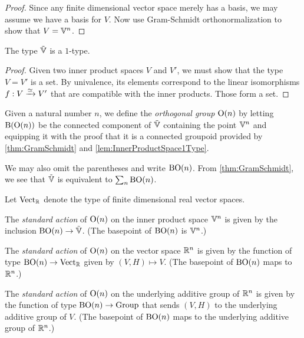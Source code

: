 \begin{proof}
  Since any finite dimensional vector space merely has a basis, we may assume
  we have a basis for $V$.  Now use Gram-Schmidt orthonormalization to show
  that $V = \mathbb V^n$.
\end{proof}

\begin{lemma}\label{lem:InnerProductSpace1Type}
  The type ${\tilde {\mathbb V}}$ is a $1$-type.
\end{lemma}

\begin{proof}
  Given two inner product spaces $V$ and $V'$, we must show that the type
  $V=V'$ is a set.  By univalence, its elements correspond to the linear
  isomorphisms $f : V \xrightarrow {\simeq} V'$ that are compatible with the
  inner products.  Those form a set.
\end{proof}

\begin{definition}\label{def:OrthogonalGroup}
  Given a natural number $n$, we define the {\em orthogonal group} $\mathrm{O}(n)$
  by letting $\mathrm{B} (\mathrm{O}(n))$ be the connected component of ${\tilde {\mathbb V}}$ containing
  the point $\mathbb V^n$ and equipping it with the proof that it is a connected
  groupoid provided by \cref{thm:GramSchmidt} and
  \cref{lem:InnerProductSpace1Type}.
\end{definition}

We may also omit the parentheses and write $\mathrm{B}\mathrm{O}(n)$.
From \cref{thm:GramSchmidt}, we see that ${\tilde {\mathbb V}}$ is equivalent to $\sum_n \mathrm{B} \mathrm{O}(n)$.

Let $\mathrm{Vect}_{\mathbb{R}}$ denote the type of finite dimensional real vector spaces.

\begin{definition}\label{def:OrthogonalGroupStandardAction}
  The {\em standard action} of $\mathrm{O}(n)$ on the inner product space $\mathbb V^n$ is given
  by the inclusion $\mathrm{B} \mathrm{O}(n) \to {\tilde {\mathbb V}}$.
  (The basepoint of $\mathrm{B} \mathrm{O}(n)$ is $\mathbb V^n$.)

  The {\em standard action} of $\mathrm{O}(n)$ on the vector space $\mathbb{R}^n$ is given
  by the function of type $\mathrm{B} \mathrm{O}(n) \to \mathrm{Vect}_{\mathbb{R}}$ given by
  $(V,H) \mapsto V$.
  (The basepoint of $\mathrm{B} \mathrm{O}(n)$ maps to $\mathbb{R}^n$.)

  The {\em standard action} of $\mathrm{O}(n)$ on the underlying additive group of $\mathbb{R}^n$ is given
  by the function of type $\mathrm{B} \mathrm{O}(n) \to \mathrm{Group}$ that sends
  $(V,H)$ to the underlying additive group of $V$.
  (The basepoint of $\mathrm{B} \mathrm{O}(n)$ maps to the underlying additive group of $\mathbb{R}^n$.)
\end{definition}
  
